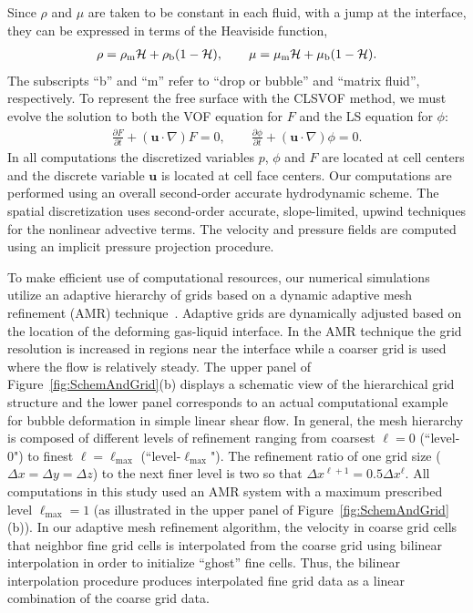 \documentclass[%
 reprint,
 showkeys,
 amsmath,amssymb,
 aps,
 prfluids,
 onecolumn
]{revtex4-2}
\newcommand{\Hea}{\mathcal{H}}
\newcommand{\vv}{\mathbf}
\newcommand{\bmu}{\vv{u}}
\begin{document}
Since $\rho$ and $\mu$ are taken to be constant in each fluid, with a jump at
the interface, they can be expressed in terms of the Heaviside function,
%
\begin{eqnarray}\label{rhomu}
  \rho=\rho_{\rm m}\Hea+\rho_{\rm b}(1-\Hea), \qquad 
  \mu=\mu_{\rm m}\Hea+\mu_{\rm b}(1-\Hea).
\end{eqnarray}
%
The subscripts ``b'' and ``m'' refer to ``drop or bubble'' and ``matrix
fluid'', respectively. To represent the free surface with the CLSVOF method, we
must evolve the solution to both the VOF equation for $F$ and the LS equation
for $\phi$:
%
\begin{align}\label{eq:clsvof}
  \frac{\partial F}{\partial t}+(\bmu\cdot\nabla)F = 0, \qquad 
  \frac{\partial \phi}{\partial t}+(\bmu\cdot\nabla)\phi = 0. 
\end{align}
%
In all computations the discretized variables $p$, $\phi$ and $F$ are located at
cell centers and the discrete variable $\bmu$ is located at cell face centers.
Our computations are performed using an overall second-order accurate
hydrodynamic scheme.  The spatial discretization uses second-order accurate,
slope-limited, upwind techniques for the nonlinear advective terms.  The
velocity and pressure fields are computed using an implicit pressure projection
procedure. 

To make efficient use of computational resources, our numerical simulations
utilize an adaptive hierarchy of grids based on a dynamic adaptive mesh
refinement (AMR) technique~\cite{SusAlmBelColHowWel99}.  Adaptive grids are
dynamically adjusted based on the location of the 
deforming gas-liquid interface.
In the AMR technique the grid resolution is increased in regions near the
interface while a coarser grid is used where the flow is relatively steady.
The upper panel of Figure~\ref{fig:SchemAndGrid}(b) displays a schematic view
of the hierarchical grid structure and the lower panel corresponds to an actual
computational example for bubble deformation in simple linear shear flow.  In
general, the mesh hierarchy is composed of different levels of refinement
ranging from coarsest $\ell=0$ (``level-0") to finest
$\ell=\ell_{\textrm{max}}$ (``level-$\ell_{\textrm{max}}$").  The refinement
ratio of one grid size ($\Delta x=\Delta y=\Delta z$) to the next finer level
is two so that $\Delta x^{\ell+1}=0.5\Delta x^{\ell}$.  All computations in
this study used an AMR system with a maximum prescribed level
$\ell_{\textrm{max}} = 1$ (as illustrated in the upper panel of
Figure~\ref{fig:SchemAndGrid}(b)).  In our adaptive mesh refinement algorithm,
the velocity in coarse grid cells that neighbor fine grid cells is interpolated
from the coarse grid using bilinear interpolation in order to initialize
``ghost'' fine cells. Thus, the bilinear interpolation procedure produces
interpolated fine grid data as a linear combination of the coarse grid data. 
\end{document}
